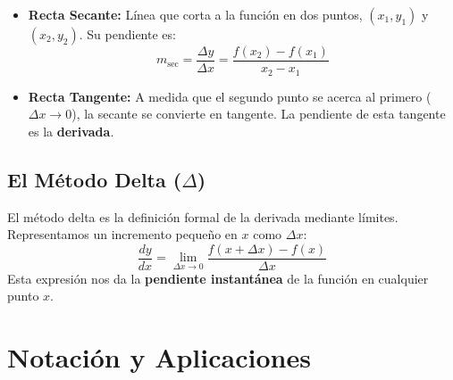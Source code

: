 \documentclass[12pt,a4paper,openany,oneside]{book}
\begin{document}
\begin{itemize}
    \item \textbf{Recta Secante:} Línea que corta a la función en dos puntos, $(x_1, y_1)$ y $(x_2, y_2)$. Su pendiente es:
    \[
    m_{\text{sec}} = \frac{\Delta y}{\Delta x} = \frac{f(x_2) - f(x_1)}{x_2 - x_1}
    \]
    \item \textbf{Recta Tangente:} A medida que el segundo punto se acerca al primero ($\Delta x \to 0$), la secante se convierte en tangente. La pendiente de esta tangente es la \textbf{derivada}.
\end{itemize}

\begin{center}
\end{center}

\subsection{El Método Delta ($\Delta$)}
El método delta es la definición formal de la derivada mediante límites. Representamos un incremento pequeño en $x$ como $\Delta x$:
\begin{equation}
\boxed{ \frac{dy}{dx} = \lim_{\Delta x \to 0} \frac{f(x + \Delta x) - f(x)}{\Delta x} }
\end{equation}
Esta expresión nos da la \textbf{pendiente instantánea} de la función en cualquier punto $x$.

\section{Notación y Aplicaciones}
\end{document}
